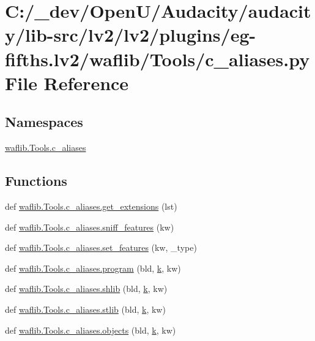 \hypertarget{lv2_2plugins_2eg-fifths_8lv2_2waflib_2_tools_2c__aliases_8py}{}\section{C\+:/\+\_\+dev/\+Open\+U/\+Audacity/audacity/lib-\/src/lv2/lv2/plugins/eg-\/fifths.lv2/waflib/\+Tools/c\+\_\+aliases.py File Reference}
\label{lv2_2plugins_2eg-fifths_8lv2_2waflib_2_tools_2c__aliases_8py}
\subsection*{Namespaces}
\begin{DoxyCompactItemize}
\item 
 \hyperlink{namespacewaflib_1_1_tools_1_1c__aliases}{waflib.\+Tools.\+c\+\_\+aliases}
\end{DoxyCompactItemize}
\subsection*{Functions}
\begin{DoxyCompactItemize}
\item 
def \hyperlink{namespacewaflib_1_1_tools_1_1c__aliases_a2c236bc286989e7a4856c0c855d7867d}{waflib.\+Tools.\+c\+\_\+aliases.\+get\+\_\+extensions} (lst)
\item 
def \hyperlink{namespacewaflib_1_1_tools_1_1c__aliases_a5dc841eb61d3c43326b4c75f23c8f771}{waflib.\+Tools.\+c\+\_\+aliases.\+sniff\+\_\+features} (kw)
\item 
def \hyperlink{namespacewaflib_1_1_tools_1_1c__aliases_a9676c4aa7388b63dcb8146ee0b1eabb7}{waflib.\+Tools.\+c\+\_\+aliases.\+set\+\_\+features} (kw, \+\_\+type)
\item 
def \hyperlink{namespacewaflib_1_1_tools_1_1c__aliases_a37f66fad92eb3e5608e4ea6cc919987c}{waflib.\+Tools.\+c\+\_\+aliases.\+program} (bld, \hyperlink{rfft2d_test_m_l_8m_adc468c70fb574ebd07287b38d0d0676d}{k}, kw)
\item 
def \hyperlink{namespacewaflib_1_1_tools_1_1c__aliases_abe1769b56363a382ee98a9ffbd9fcc3c}{waflib.\+Tools.\+c\+\_\+aliases.\+shlib} (bld, \hyperlink{rfft2d_test_m_l_8m_adc468c70fb574ebd07287b38d0d0676d}{k}, kw)
\item 
def \hyperlink{namespacewaflib_1_1_tools_1_1c__aliases_ac17e9b8cf40b90cb8f7a0262e1b6208e}{waflib.\+Tools.\+c\+\_\+aliases.\+stlib} (bld, \hyperlink{rfft2d_test_m_l_8m_adc468c70fb574ebd07287b38d0d0676d}{k}, kw)
\item 
def \hyperlink{namespacewaflib_1_1_tools_1_1c__aliases_a7b447b92707b996e71d30214f7b28555}{waflib.\+Tools.\+c\+\_\+aliases.\+objects} (bld, \hyperlink{rfft2d_test_m_l_8m_adc468c70fb574ebd07287b38d0d0676d}{k}, kw)
\end{DoxyCompactItemize}
